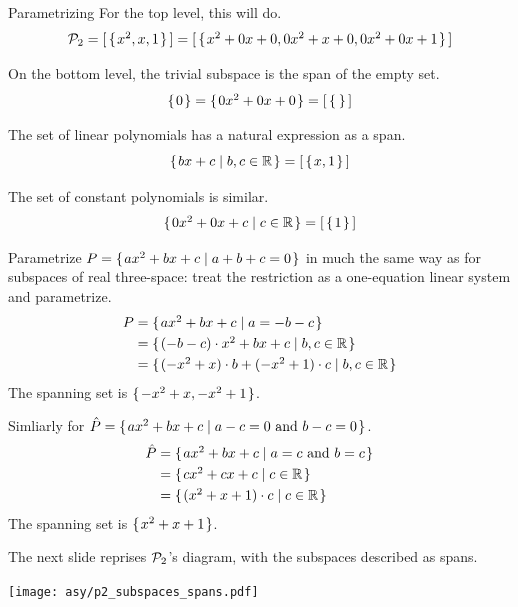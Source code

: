 \begin{frame}{Parametrizing}
\ex
For the top level, this will do.
\begin{equation*}
  \mathcal{P}_2
  =\relax [\,\mbox{$\{\hspace{0.1em}x^2,x,1\hspace{0.1em}\}$}\,\relax ]
  =\relax [\,\mbox{$\{\hspace{0.1em}x^2+0x+0,
               0x^2+x+0,
               0x^2+0x+1\hspace{0.1em}\}$}\,\relax ]       
\end{equation*}

\ex
On the bottom level, 
the trivial subspace is the span of the empty set.
\begin{equation*}
  \set{0}
  =\set{0x^2+0x+0}
  =\spanof{\,\set{}\,}
\end{equation*}

\pause
\ex
The set of linear polynomials has a natural expression as a span.
\begin{equation*}
 \mbox{$\{\hspace{0.1em}bx+c\mid b,c\in\mathbb{R}\hspace{0.1em}\}$}
  =\relax [\,\mbox{$\{\hspace{0.1em}x,1\hspace{0.1em}\}$}\,\relax ]
\end{equation*}

\ex
The set of constant polynomials is similar.
\begin{equation*}
  \mbox{$\{\hspace{0.1em}0x^2+0x+c\mid c\in\mathbb{R}\hspace{0.1em}\}$}
  =\relax [\,\mbox{$\{\hspace{0.1em}1\hspace{0.1em}\}$}\,\relax ]
\end{equation*}
\end{frame}


\begin{frame}
\ex
Parametrize $P=\mbox{$\{\hspace{0.1em}ax^2+bx+c\mid a+b+c=0\hspace{0.1em}\}$}$ 
in much the same way as for subspaces of real three-space:
treat the restriction as a one-equation linear system and parametrize.
\begin{align*}
  P
  &=\mbox{$\{\hspace{0.1em}ax^2+bx+c\mid a=-b-c\hspace{0.1em}\}$}     \\
  &=\mbox{$\{\hspace{0.1em}(-b-c)\cdot x^2+bx+c\mid b,c\in\mathbb{R}\hspace{0.1em}\}$}  \\     
  &=\mbox{$\{\hspace{0.1em}(-x^2+x)\cdot b+(-x^2+1)\cdot c\mid b,c\in\mathbb{R}\hspace{0.1em}\}$}       
\end{align*}
The spanning set is $\mbox{$\{\hspace{0.1em}-x^2+x, -x^2+1\hspace{0.1em}\}$}$.

\pause
\ex
Simliarly for 
$\hat{P}=\mbox{$\{\hspace{0.1em}ax^2+bx+c\mid \text{$a-c=0$ and $b-c=0$}\hspace{0.1em}\}$}$.
\begin{align*}
  \hat{P}
  &=\mbox{$\{\hspace{0.1em}ax^2+bx+c\mid \text{$a=c$ and $b=c$}\hspace{0.1em}\}$}     \\
  &=\mbox{$\{\hspace{0.1em}cx^2+cx+c\mid c\in\mathbb{R}\hspace{0.1em}\}$}     \\
  &=\mbox{$\{\hspace{0.1em}(x^2+x+1)\cdot c \mid c\in\mathbb{R}\hspace{0.1em}\}$}       
\end{align*}
The spanning set is $\mbox{$\{\hspace{0.1em}x^2+x+1\hspace{0.1em}\}$}$.

\pause\medskip
The next slide reprises $\mathcal{P}_2$'s diagram,
with the subspaces described as spans.
\end{frame}
\begin{frame}
{\centering\texttt{[image: asy/p2\_subspaces\_spans.pdf]}}  
\end{frame}


